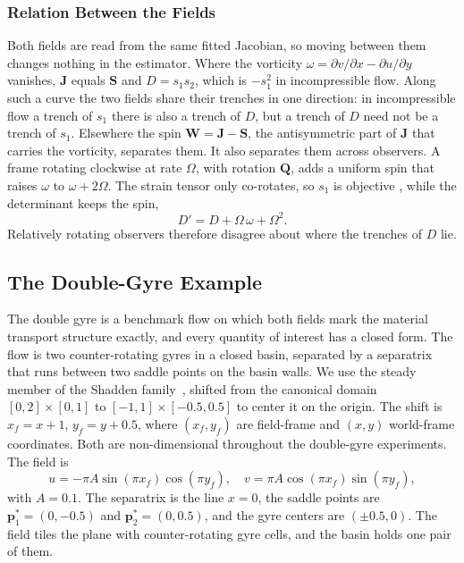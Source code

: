 \documentclass[lettersize,journal]{IEEEtran}
\begin{document}
\subsubsection{Relation Between the Fields}
Both fields are read from the same fitted Jacobian, so moving between
them changes nothing in the estimator. Where the vorticity
$\omega = \partial v/\partial x - \partial u/\partial y$ vanishes,
$\mathbf{J}$ equals $\mathbf{S}$ and $D = s_1 s_2$, which is $-s_1^2$ in
incompressible flow. Along such a curve the two fields share their
trenches in one direction: in incompressible flow a trench of $s_1$ there
is also a trench of $D$, but a trench of $D$ need not be a trench of $s_1$. Elsewhere the spin $\mathbf{W} = \mathbf{J} - \mathbf{S}$, the
antisymmetric part of $\mathbf{J}$ that carries the vorticity, separates
them. It also separates them across observers. A frame rotating clockwise at rate
$\Omega$, with rotation $\mathbf{Q}$, adds a uniform spin that raises
$\omega$ to $\omega + 2\Omega$. The strain tensor only co-rotates, so
$s_1$ is objective \cite{19}, while the determinant keeps the spin,
\begin{equation}
    D' = D + \Omega\,\omega + \Omega^2 .
    \label{eq:D_not_objective}
\end{equation}
Relatively rotating observers therefore disagree about where the
trenches of $D$ lie. 

\subsection{The Double-Gyre Example}
\label{sec:dg_example}

The double gyre is
a benchmark flow on which both fields mark the material transport structure
exactly, and every
quantity of interest has a closed form. The flow is two counter-rotating gyres in a
closed basin, separated by a separatrix that runs between two saddle points on
the basin walls. We use the steady member of the Shadden
family~\cite{17}, shifted from the canonical domain
$[0,2]\times[0,1]$ to $[-1,1]\times[-0.5,0.5]$ to center it on the origin. The
shift is $x_f = x + 1$, $y_f = y + 0.5$, where $(x_f, y_f)$ are field-frame and
$(x, y)$ world-frame coordinates. Both are non-dimensional throughout the
double-gyre experiments. The field is
\begin{equation}
u = -\pi A \sin(\pi x_f)\cos(\pi y_f), \quad
v = \pi A \cos(\pi x_f)\sin(\pi y_f),
\label{eq:dg_u}
\end{equation}
with $A = 0.1$. The separatrix is the line $x = 0$, the saddle points are
$\mathbf{p}_1^* = (0, -0.5)$ and $\mathbf{p}_2^* = (0, 0.5)$, and the gyre
centers are $(\pm 0.5, 0)$. The field tiles the plane with counter-rotating
gyre cells, and the basin holds one pair of them.
\end{document}
